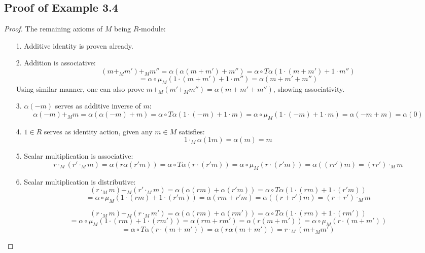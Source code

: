 \documentclass{article}
\begin{document}
\hfil

\subsection{Proof of Example 3.4}\label{exmp3_4}
\begin{proof}
    The remaining axioms of $M$ being $R$-module:
    \begin{itemize}
        \item[1.] Additive identity is proven already.
        \item[2.] Addition is associative:
        \[(m+_M m')+_M m'' = \alpha(\alpha(m+m')+m'') = \alpha\circ T\alpha(1\cdot (m+m')+1\cdot m'')\]
        \[= \alpha\circ \mu_M(1\cdot (m+m')+1\cdot m'')= \alpha(m+m'+m'')\]
        Using similar manner, one can also prove $m+_M (m'+_M m'')=\alpha(m+m'+m'')$, showing associativity.
        \item[3.] $\alpha(-m)$ serves as additive inverse of $m$:
        \[\alpha(-m)+_M m= \alpha(\alpha(-m)+m) = \alpha\circ T\alpha(1\cdot (-m)+1\cdot m) = \alpha\circ \mu_M(1\cdot (-m)+1\cdot m) = \alpha(-m+m)=\alpha(0)\]

        \item[4.] $1\in R$ serves as identity action, given any $m\in M$ satisfies:
        \[1\cdot_M \alpha(1 m) = \alpha(m)=m\]
        \item[5.] Scalar multiplication is associative:
        \[r\cdot_M (r'\cdot_M m) = \alpha(r \alpha(r'm)) = \alpha\circ T\alpha (r\cdot (r' m)) = \alpha\circ \mu_M (r\cdot (r'm)) = \alpha((r r')m) = (r r')\cdot_M m\]
        \item[6.] Scalar multiplication is distributive:
        \[(r\cdot_M m)+_M (r'\cdot_M m) = \alpha(\alpha(rm)+\alpha(r'm))=\alpha\circ T\alpha(1\cdot (rm)+1\cdot (r'm))\]
        \[= \alpha\circ \mu_M(1\cdot (rm)+1\cdot (r'm)) = \alpha(rm+r'm) = \alpha((r+r')m) = (r+r')\cdot_M m\]

        \hfil

        \[(r\cdot_M m)+_M (r\cdot_M m') =\alpha(\alpha(rm)+\alpha(rm')) = \alpha\circ T\alpha(1\cdot(rm)+1\cdot (rm'))\]
        \[= \alpha\circ\mu_M(1\cdot(rm)+1\cdot(rm'))=\alpha(rm+rm') =\alpha(r(m+m'))= \alpha\circ \mu_M (r\cdot (m+m')) \]
        \[= \alpha\circ T\alpha(r\cdot (m+m')) = \alpha(r\alpha(m+m')) = r\cdot_M (m+_M m')\]
    \end{itemize}
\end{proof}

\hfil
\end{document}
